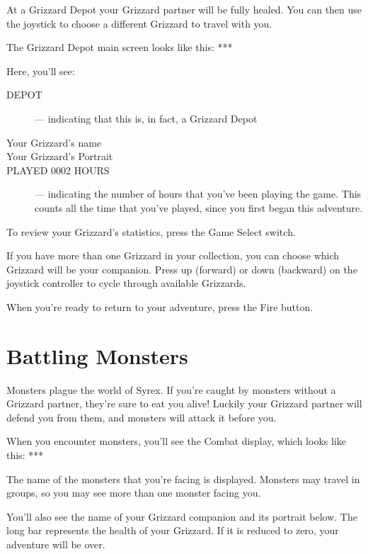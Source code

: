 \documentclass[12pt,twoside,openright,book]{memoir}
\begin{document}
At  a  Grizzard  Depot  your  Grizzard partner  will  be  fully  healed.
\ifdef\DEMO\else You  can then  use the joystick  to choose  a different
Grizzard to travel with you. \fi

The Grizzard Depot main screen looks like this: ***

Here, you'll see:

\begin{description}
  
\item[DEPOT] --- indicating that this is, in fact, a Grizzard Depot
\item[Your Grizzard's name] 
\item[Your Grizzard's Portrait] 
\item[PLAYED 0002 HOURS] --- indicating  the number of hours that you've
  been playing  the game. This counts  all the time that  you've played,
  since you  first began this  adventure.

\end{description}

To review your Grizzard's statistics, press the Game Select switch.

\ifdef\DEMO\else
If you  have more than one  Grizzard in your collection,  you can choose
which  Grizzard will  be  your  companion. Press  up  (forward) or  down
(backward)  on  the  joystick  controller  to  cycle  through  available
Grizzards.
\fi

When you're ready to return to your adventure, press the Fire button.


\section{Battling Monsters}

Monsters plague the world of Syrex. If you're caught by monsters without
a Grizzard partner, they're sure to eat you alive! Luckily your Grizzard
partner  will  defend  you  from  them,  and  monsters  will  attack  it
before you.

When you encounter monsters, you'll  see the Combat display, which looks
like this: ***

The name of  the monsters that you're facing is  displayed. Monsters may
travel in groups, so you may see more than one monster facing you.

You'll also  see the name  of your  Grizzard companion and  its portrait
below. The  long bar represents  the health of  your Grizzard. If  it is
reduced to zero, your adventure will be over.
\end{document}

